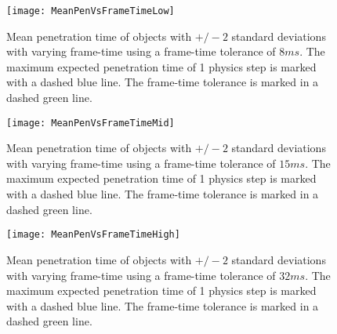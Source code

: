 \begin{figure}[t]
	\centering
	\texttt{[image: MeanPenVsFrameTimeLow]}
	\caption{Mean penetration time of objects with $+/-2$ standard deviations with varying frame-time using a frame-time tolerance of $8ms$. The maximum expected penetration time of 1 physics step is marked with a dashed blue line. The frame-time tolerance is marked in a dashed green line.}
	\label{fig_CollisionsPenVsFrameTimeLow}
\end{figure}
\begin{figure}[t]
	\centering
	\texttt{[image: MeanPenVsFrameTimeMid]}
	\caption{Mean penetration time of objects with $+/-2$ standard deviations with varying frame-time using a frame-time tolerance of $15ms$. The maximum expected penetration time of 1 physics step is marked with a dashed blue line. The frame-time tolerance is marked in a dashed green line.}
	\label{fig_CollisionsPenVsFrameTimeMid}
\end{figure}
\begin{figure}[t]
	\centering
	\texttt{[image: MeanPenVsFrameTimeHigh]}
	\caption{Mean penetration time of objects with $+/-2$ standard deviations with varying frame-time using a frame-time tolerance of $32ms$. The maximum expected penetration time of 1 physics step is marked with a dashed blue line. The frame-time tolerance is marked in a dashed green line.}
	\label{fig_CollisionsPenVsFrameTimeHigh}
\end{figure}

%
%

